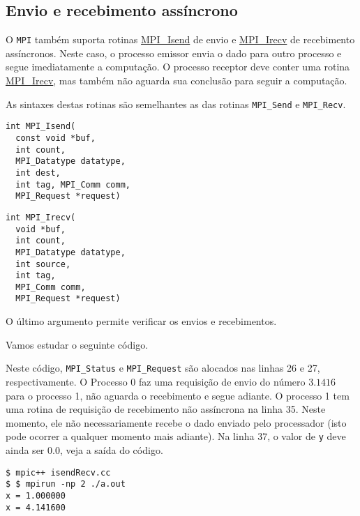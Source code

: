


\subsection{Envio e recebimento assíncrono}

O \verb+MPI+ também suporta rotinas \href{https://www.open-mpi.org/doc/current/man3/MPI_Isend.3.php}{MPI\_Isend} de envio e \href{https://www.open-mpi.org/doc/current/man3/MPI_Irecv.3.php}{MPI\_Irecv} de recebimento assíncronos. Neste caso, o processo emissor envia o dado para outro processo e segue imediatamente a computação. O processo receptor deve conter uma rotina \href{https://www.open-mpi.org/doc/current/man3/MPI_Irecv.3.php}{MPI\_Irecv}, mas também não aguarda sua conclusão para seguir a computação.

As sintaxes destas rotinas são semelhantes as das rotinas \verb+MPI_Send+ e \verb+MPI_Recv+.

\begin{verbatim}
int MPI_Isend(
  const void *buf, 
  int count, 
  MPI_Datatype datatype, 
  int dest,
  int tag, MPI_Comm comm, 
  MPI_Request *request)
\end{verbatim}

\begin{verbatim}
int MPI_Irecv(
  void *buf, 
  int count, 
  MPI_Datatype datatype,
  int source, 
  int tag, 
  MPI_Comm comm, 
  MPI_Request *request)
\end{verbatim}
O último argumento permite verificar os envios e recebimentos.

Vamos estudar o seguinte código.



Neste código, \verb+MPI_Status+ e \verb+MPI_Request+ são alocados nas linhas 26 e 27, respectivamente. O Processo 0 faz uma requisição de envio do número $3.1416$ para o processo 1, não aguarda o recebimento e segue adiante. O processo 1 tem uma rotina de requisição de recebimento não assíncrona na linha 35. Neste momento, ele não necessariamente recebe o dado enviado pelo processador (isto pode ocorrer a qualquer momento mais adiante). Na linha 37, o valor de \verb+y+ deve ainda ser $0.0$, veja a saída do código.

\begin{verbatim}
$ mpic++ isendRecv.cc
$ $ mpirun -np 2 ./a.out
x = 1.000000
x = 4.141600
\end{verbatim}

